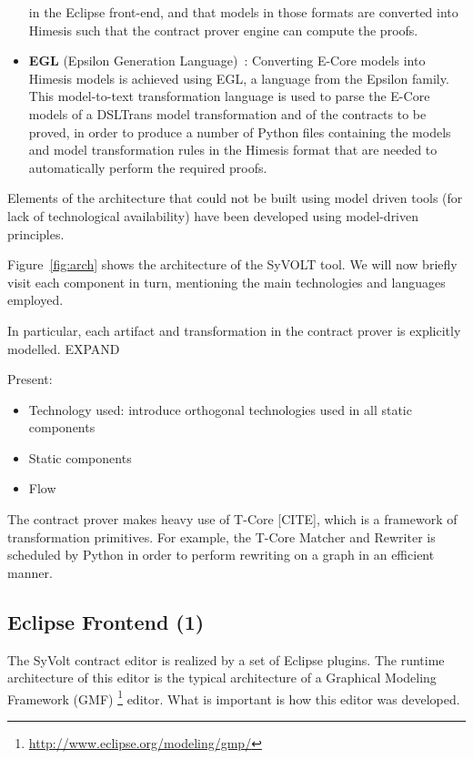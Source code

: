 \begin{itemize}
  in the Eclipse front-end, and that models in those formats are converted into
  Himesis such that the contract prover engine can compute the proofs.\\
  \item \textbf{EGL} (Epsilon Generation Language)~\cite{}: Converting E-Core
  models into Himesis models is achieved using EGL, a language from the Epsilon family. This
  model-to-text transformation language is used to parse the E-Core models of
  a DSLTrans model transformation and of the contracts to be proved, in order
  to produce a number of Python files containing the models and model
  transformation rules in the Himesis format that are needed to automatically
  perform the required proofs.

\end{itemize}

Elements of the
architecture that could not be built using model driven tools (for lack of
technological availability) have been developed using model-driven principles.



Figure~\ref{fig:arch} shows the architecture of the SyVOLT tool. We will now
briefly visit each component in turn, mentioning the main technologies and
languages employed.


In particular, each artifact and transformation in the contract prover is
explicitly modelled. EXPAND

Present:
\begin{itemize}
  \item Technology used: introduce orthogonal technologies used in all
  static components
  \item Static components
  \item Flow
\end{itemize}

The contract prover makes heavy use of T-Core [CITE], which is a framework of
transformation primitives. For example, the T-Core Matcher and Rewriter is
scheduled by Python in order to perform rewriting on a graph in an efficient
manner.


\subsection{Eclipse Frontend (1)}

The SyVolt contract editor is realized by a set of Eclipse plugins.
The runtime architecture of this editor is the typical architecture of a Graphical Modeling Framework (GMF) \footnote{\url{http://www.eclipse.org/modeling/gmp/}} editor. 
What is important is how this editor was developed.

